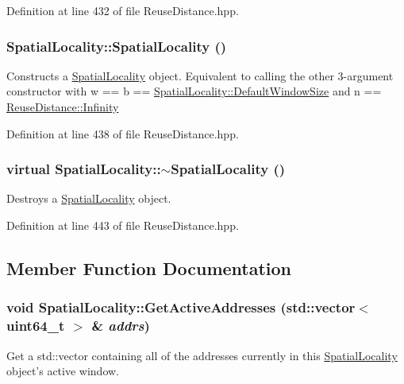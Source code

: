 Definition at line 432 of file ReuseDistance.hpp.

\hypertarget{class_spatial_locality_a449d21fbe63121ea92aaf5c1e0b8cb9c}{
\subsubsection[{SpatialLocality}]{\setlength{\rightskip}{0pt plus 5cm}SpatialLocality::SpatialLocality ()}}
\label{class_spatial_locality_a449d21fbe63121ea92aaf5c1e0b8cb9c}
Constructs a \hyperlink{class_spatial_locality}{SpatialLocality} object. Equivalent to calling the other 3-\/argument constructor with w == b == \hyperlink{class_spatial_locality_a563aa890ea539ae76c942fd1827a3095}{SpatialLocality::DefaultWindowSize} and n == \hyperlink{class_reuse_distance_a59f7f0ac6ad014472537619394ac7375}{ReuseDistance::Infinity} 

Definition at line 438 of file ReuseDistance.hpp.

\hypertarget{class_spatial_locality_abfdaf3722786c5ad9ea65f885cbbebc6}{
\subsubsection[{$\sim$SpatialLocality}]{\setlength{\rightskip}{0pt plus 5cm}virtual SpatialLocality::$\sim$SpatialLocality ()}}
\label{class_spatial_locality_abfdaf3722786c5ad9ea65f885cbbebc6}
Destroys a \hyperlink{class_spatial_locality}{SpatialLocality} object. 

Definition at line 443 of file ReuseDistance.hpp.



\subsection{Member Function Documentation}
\hypertarget{class_spatial_locality_afef7ecfce7f238dbef37499e08edfb98}{
\subsubsection[{GetActiveAddresses}]{\setlength{\rightskip}{0pt plus 5cm}void SpatialLocality::GetActiveAddresses (std::vector$<$ uint64\_\-t $>$ \& {\em addrs})}}
\label{class_spatial_locality_afef7ecfce7f238dbef37499e08edfb98}
Get a std::vector containing all of the addresses currently in this \hyperlink{class_spatial_locality}{SpatialLocality} object's active window.


